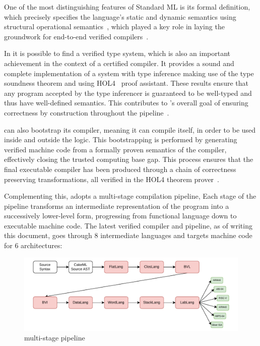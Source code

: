 One of the most distinguishing features of Standard ML is its formal definition, which precisely specifies the language's 
static and dynamic semantics using structural operational semantics~\cite{milner1997definition}, which played a key role in laying the 
groundwork for end-to-end verified compilers~\cite{Syme93}.

In \cml it is possible to find a verified type system, which is also an important achievement in the context of a certified compiler.
It provides a sound and complete implementation of a system with type inference making use of the type soundness theorem and using HOL4~\cite{SlindN08} 
proof assistant. These results ensure that any \cml program accepted by the type inferencer is guaranteed to be 
well-typed and thus have well-defined semantics. This contributes to \cml's overall goal of ensuring correctness by construction 
throughout the pipeline~\cite{TanOK15}.

\cml can also bootstrap its compiler, meaning it can compile itself, in order to be used inside and outside the logic. This 
bootstrapping is performed by generating verified machine code from a formally proven semantics of the compiler, effectively 
closing the trusted computing base gap. This process ensures that the final executable compiler has been produced through a 
chain of correctness preserving transformations, all verified in the HOL4 theorem prover~\cite{TanMKFON19, POPL14}.

Complementing this, \cml adopts a multi-stage compilation pipeline, Each stage of the pipeline transforms an intermediate representation
of the program into a successively lower-level form, progressing from functional language down to executable machine code. The latest 
verified \cml compiler and pipeline, as of writing this document, goes through 8 intermediate languages and targets machine code 
for 6 architectures:

\begin{figure}[H]
    \centering
    \includegraphics[width=\linewidth]{images/cake.pdf}
    \caption{\cml multi-stage pipeline}
    \label{fig:CakeMLPipeline}
\end{figure}

